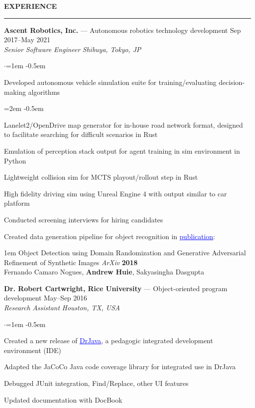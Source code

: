 \documentclass[10pt, a4paper]{article}
\newenvironment{aSection}[1]{
    \medskip \textbf{\uppercase{#1}}
    \smallskip
    \hrule
    \begin{list}{}{
            \setlength{\leftmargin}{1.5em}
        }
    \item[]
    }{
    \end{list}
}
\newenvironment{expSubsection}[4]{
    {#1} \hfill {#2} \\
    \textit{#3} \hfill \textit{#4}
    \smallskip
    \begin{list}{$\cdot$}{\leftmargin=1em}
    \itemsep -0.5em \vspace{-0.5em}
    }{
    \end{list}
    \vspace{0.5em}
}
\newenvironment{subList}{
    \begin{list}{\raisebox{.4ex}{\tiny$\succ$}}{\leftmargin=2em}
    \itemsep -0.5em \vspace{-0.5em}
    }{
    \end{list}
}
\begin{document}
\begin{aSection}{Experience}
    \begin{expSubsection}
        {\textbf{Ascent Robotics, Inc.} --- Autonomous robotics technology development}
        {Sep 2017--May 2021}
        {Senior Software Engineer}
        {Shibuya, Tokyo, JP}
    \item Developed autonomous vehicle simulation suite for training/evaluating decision-making
        algorithms
        \begin{subList}
            \item Lanelet2/OpenDrive map generator for in-house road network format, designed to
                facilitate searching for difficult scenarios in Rust
            \item Emulation of perception stack output for agent training in sim environment in
                Python
            \item Lightweight collision sim for MCTS playout/rollout step in Rust
            \item High fidelity driving sim using Unreal Engine 4 with output similar to car
                platform
        \end{subList}
    \item Conducted screening interviews for hiring candidates
    \item Created data generation pipeline for object recognition in
        \href{https://arxiv.org/abs/1805.11778}{\textcolor{blue}{\underline{publication}}}:
        \begin{adjustwidth}{1em}{}
            \vspace{-0.5em}
            Object Detection using Domain Randomization and Generative Adversarial Refinement
            of Synthetic Images \textit{ArXiv} \textbf{2018}\\
            \hspace*{1em} Fernando Camaro Nogues, \textbf{Andrew Huie}, Sakyasingha Dasgupta
        \end{adjustwidth}
    \end{expSubsection}

    \begin{expSubsection}
        {\textbf{Dr. Robert Cartwright, Rice University} --- Object-oriented program development}
        {May--Sep 2016}
        {Research Assistant}
        {Houston, TX, USA}
    \item Created a new release of
        \href{http://www.drjava.org}{\textcolor{blue}{\underline{DrJava}}}, a pedagogic integrated
        development environment (IDE)
    \item Adapted the JaCoCo Java code coverage library for integrated use in DrJava
    \item Debugged JUnit integration, Find/Replace, other UI features
    \item Updated documentation with DocBook
    \end{expSubsection}


\end{aSection}
\end{document}
